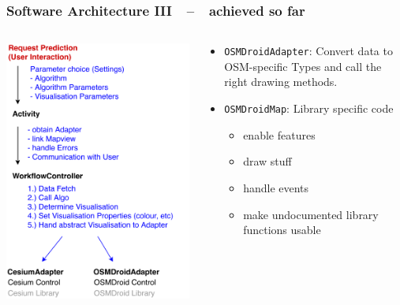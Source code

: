 \documentclass[xcolor=dvipsnames]{beamer}
\begin{document}
\begin{frame}
	\frametitle{\textbf{Software Architecture III}~~--~~achieved so far}
	\begin{columns}
	\begin{column}{0.5\textwidth}
		\includegraphics[width=\textwidth]{diagrams/controller-flow.pdf}
	\end{column}
	\begin{column}{0.5\textwidth}
		\fontsize{9pt}{7.2}\selectfont
		\begin{itemize}
		 	 \item \lstinline$OSMDroidAdapter$: Convert data to OSM-specific Types and call the right drawing methods.
		 	 \item \lstinline$OSMDroidMap$: Library specific code %
		 	 \begin{itemize}
		 	  	 \item enable features
		 	  	 \item draw stuff
		 	  	 \item handle events
		 	  	 \item make undocumented library functions usable
		 	 \end{itemize}
		\end{itemize}
 	\end{column}
	\end{columns}
\end{frame}
\end{document}
